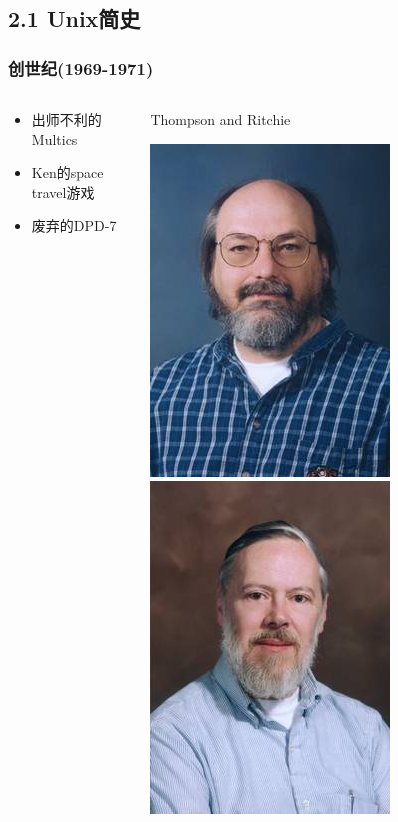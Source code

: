 \documentclass[xcolor=svgnames,bigger,presentation]{beamer}
\begin{document}
\subsection{2.1 Unix简史}
\label{sec-2-1}
\begin{frame}
\frametitle{创世纪(1969-1971)}
\label{sec-2-1-1}
\begin{columns}
\begin{column}{0.5\textwidth}
\label{sec-2-1-1-1}
\begin{itemize}

\item 出师不利的Multics
\label{sec-2-1-1-2}%

\item Ken的space travel游戏
\label{sec-2-1-1-3}%

\item 废弃的DPD-7
\label{sec-2-1-1-4}%
\end{itemize} %
\end{column}
\begin{column}{0.5\textwidth}
\begin{exampleblock}{Thompson and Ritchie}
\label{sec-2-1-1-5}

\includegraphics[width=.5\textwidth]{img/thompson02.jpg}
\includegraphics[width=.5\textwidth]{img/ritchie02.jpg}
\end{exampleblock}
\end{column}
\end{columns}
\end{frame}
\end{document}
